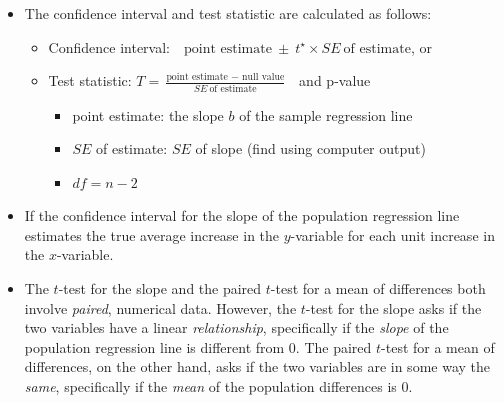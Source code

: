 \begin{itemize}
\begin{itemize}
\end{itemize}
\item The confidence interval and test statistic are calculated as follows:   
\begin{itemize}
\item[] Confidence interval:\ \  $\text{point estimate}\ \pm\ t^{\star} \times SE\ \text{of estimate}$, or
\item[] Test statistic:  $T = \frac{\text{point estimate } - \text{ null value}}{SE\ \text{of estimate}}$ \ and p-value
\begin{itemize}
\item[] point estimate:  the slope $b$ of the sample regression line
\item[] $SE$ of estimate:  $SE$ of slope (find using computer output)
\item[] $df = n-2$
\end{itemize}
\end{itemize}


\item If the confidence interval for the slope of the population regression line estimates the true average increase in the $y$-variable for each unit increase in the $x$-variable.

\item The $t$-test for the slope and the paired $t$-test for a mean of differences both involve \emph{paired}, numerical data.  However, the $t$-test for the slope asks if the two variables have a linear \emph{relationship}, specifically if the \emph{slope} of the population regression line is different from 0.  The paired $t$-test for a mean of differences, on the other hand, asks if the two variables are in some way the \emph{same}, specifically if the \emph{mean} of the population differences is 0.  
\end{itemize}

{}



\reviewchapterheader{}

